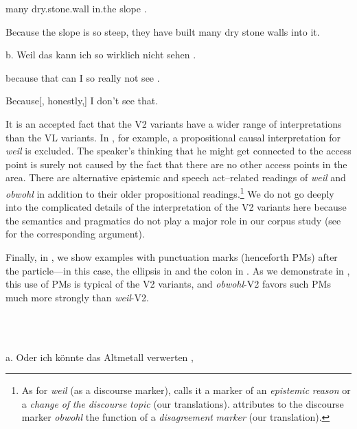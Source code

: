 many    dry.stone.wall  in.the  slope  .



Because the slope is so steep, they have built many dry stone walls into it.



b.  Weil    das  kann  ich  so  wirklich  nicht  sehen  .



because  that  can  I  so  really    not  see  .



Because[, honestly,] I don’t see that.



It is an accepted fact that the V2 variants have a wider range of interpretations than the VL variants. In , for example, a propositional causal interpretation for \textit{weil} is excluded. The speaker’s thinking that he might get connected to the access point is surely not caused by the fact that there are no other access points in the area. There are alternative epistemic and speech act–related readings of \textit{weil} and \textit{obwohl} in addition to their older propositional readings.\footnote{As for \textit{weil} (as a discourse marker), \citet{Günthner1996} calls it a marker of an \textit{epistemic} \textit{reason} or a \textit{change} \textit{of} \textit{the} \textit{discourse} \textit{topic} (our translations). \citet{Günthner2000} attributes to the discourse marker \textit{obwohl} the function of a \textit{disagreement} \textit{marker} (our translation).} We do not go deeply into the complicated details of the interpretation of the V2 variants here because the semantics and pragmatics do not play a major role in our corpus study (see  for the corresponding argument).



Finally, in , we show examples with punctuation marks (henceforth PMs) after the particle—in this case, the ellipsis in  and the colon in . As we demonstrate in , this use of PMs is typical of the V2 variants, and \textit{obwohl}{}-V2 favors such PMs much more strongly than \textit{weil}{}-V2.



\ea%
    \label{ex:key:4}
    \gll\\
        \\
    \glt
    \z

          a.  Oder  ich  könnte  das  Altmetall    verwerten  ,



